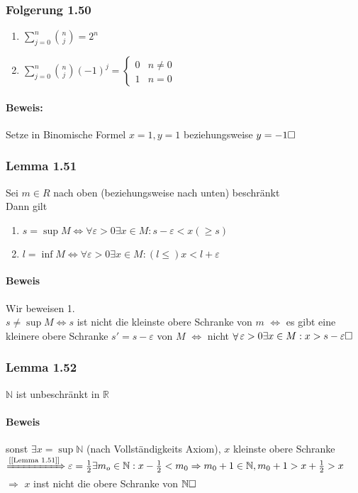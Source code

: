 \documentclass[a4paper]{scrartcl}
\DeclareMathOperator{\Forall}{\forall}%
\begin{document}
\subsubsection{Folgerung 1.50}
\label{sec-2-9-17}
\begin{enumerate}
\item $\sum_{j = 0}^n \binom{n}{j} = 2^n$
\item $\sum_{j = 0}^n \binom{n}{j} (-1)^j = \begin{cases}0 & n \neq 0 \\ 1 & n = 0\end{cases}$
\end{enumerate}
\paragraph{Beweis:}
\label{sec-2-9-17-1}
Setze in Binomische Formel $x = 1, y = 1$ beziehungsweise $y = -1 \hfill\square$
\subsubsection{Lemma 1.51}
\label{sec-2-9-18}
Sei $m\in R$ nach oben (beziehungsweise nach unten) beschränkt \\
    Dann gilt
\begin{enumerate}
\item $s = \sup M \Leftrightarrow \Forall \varepsilon > 0 \exists x\in M: s - \varepsilon < x (\geq s)$
\item $l=\inf M \Leftrightarrow \Forall \varepsilon > 0 \exists x\in M: (l \leq) x < l + \varepsilon$
\end{enumerate}
\paragraph{Beweis}
\label{sec-2-9-18-1}
Wir beweisen 1. \\
     $s\neq \sup M\Leftrightarrow s$ ist nicht die kleinste obere Schranke von $m$ $\Leftrightarrow$ es gibt eine kleinere obere Schranke $s' = s - \varepsilon$ von $M$ $\Leftrightarrow$
nicht $\Forall \varepsilon > 0\exists x\in M: x > s - \varepsilon \hfill \square$
\subsubsection{Lemma 1.52}
\label{sec-2-9-19}
$\mathbb{N}$ ist unbeschränkt in $\mathbb{R}$
\paragraph{Beweis}
\label{sec-2-9-19-1}
sonst $\exists x = \sup \mathbb{N}$ (nach Vollständigkeits Axiom), $x$ kleinste obere Schranke $\xRightarrow{\text{[[Lemma 1.51]]}} \varepsilon= \frac{1}{2} \exists m_o \in \mathbb{N}:x - \frac{1}{2} < m_0 \Rightarrow m_0 + 1 \in \mathbb{N},m_0 + 1 > x + \frac{1}{2} > x$
$\Rightarrow$ $x$ inst nicht die obere Schranke von $\mathbb{N}\hfill\square$
\end{document}
